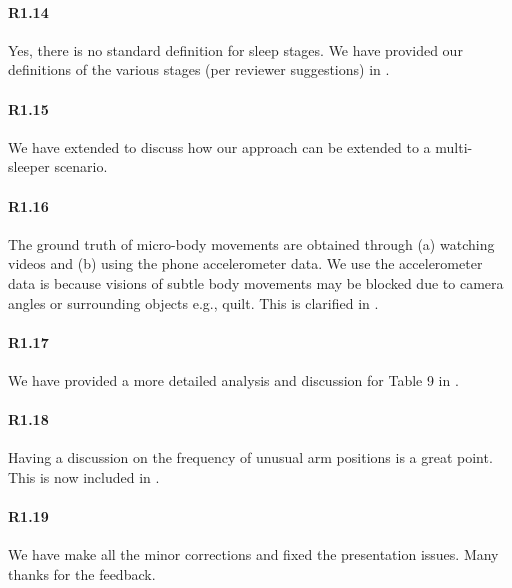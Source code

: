 \paragraph{R1.14} Yes, there is no standard definition for sleep stages. We have provided our definitions of the various stages (per reviewer suggestions) in .

\paragraph{R1.15} We have extended  to discuss how our approach can be extended to a multi-sleeper scenario.

\paragraph{R1.16} The ground truth of micro-body movements are obtained through (a) watching videos and (b) using the phone accelerometer data. We use the accelerometer data is because visions of subtle body movements may be blocked due to camera angles or surrounding objects e.g., quilt. This is clarified in .

\paragraph{R1.17} We have provided a more detailed analysis and discussion for Table 9 in .

\paragraph{R1.18} Having a discussion on the frequency of unusual arm positions is a great point. This is now included in .

\paragraph{R1.19} We have make all the minor corrections and fixed the presentation issues. Many thanks for the feedback.
